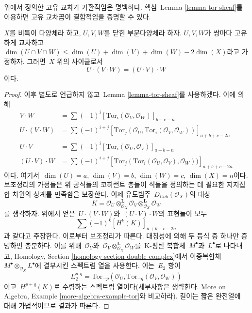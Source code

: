 \noindent
위에서 정의한 고유 교차가 가환적임은 명백하다.
핵심\  Lemma \ref{lemma-tor-sheaf}를 이용하면 고유 교차곱이 결합적임을
증명할 수 있다.

\begin{lemma}
\label{lemma-associative}
$X$를 비특이 다양체라 하고, $U, V, W$를 닫힌 부분다양체라 하자.
$U, V, W$가 쌍마다 고유하게 교차하고\ 
$\dim(U \cap V \cap W) \leq \dim(U) + \dim(V) + \dim(W) - 2\dim(X)$라고
가정하자. 그러면\  $X$ 위의 사이클로서
$$
U \cdot (V \cdot W) = (U \cdot V) \cdot W
$$
이다.
\end{lemma}

\begin{proof}
이후 별도로 언급하지 않고\  Lemma \ref{lemma-tor-sheaf}를 사용하겠다.
이에 의해
\begin{align*}
V \cdot W
& =
\sum (-1)^i [\text{Tor}_i(\mathcal{O}_V, \mathcal{O}_W)]_{b + c - n} \\
U \cdot (V \cdot W)
& =
\sum (-1)^{i + j}
[
\text{Tor}_j(\mathcal{O}_U, \text{Tor}_i(\mathcal{O}_V, \mathcal{O}_W))
]_{a + b + c - 2n} \\
U \cdot V
& =
\sum (-1)^i [\text{Tor}_i(\mathcal{O}_U, \mathcal{O}_V)]_{a + b - n} \\
(U \cdot V) \cdot W
& =
\sum (-1)^{i + j}
[
\text{Tor}_j(\text{Tor}_i(\mathcal{O}_U, \mathcal{O}_V), \mathcal{O}_W))
]_{a + b + c - 2n}
\end{align*}
이다. 여기서\  $\dim(U) = a$, $\dim(V) = b$, $\dim(W) = c$,
$\dim(X) = n$이다. 보조정리의 가정들은 위 공식들의 코히런트 층들이
식들을 정의하는 데 필요한 지지집합 차원의 상계를 만족함을 보장한다.
이제 유도범주\  $D_{\textit{Coh}}(\mathcal{O}_X)$의 대상
$$
K =
\mathcal{O}_U \otimes^\mathbf{L}_{\mathcal{O}_X} \mathcal{O}_V
\otimes^\mathbf{L}_{\mathcal{O}_X} \mathcal{O}_W
$$
를 생각하자. 위에서 얻은\  $U \cdot (V \cdot W)$와\ 
$(U \cdot V) \cdot W$의 표현들이 모두
$$
\sum (-1)^k [H^k(K)]_{a + b + c - 2n}
$$
과 같다고 주장한다. 이로부터 보조정리가 따른다. 대칭성에 의해 두 등식 중
하나만 증명하면 충분하다. 이를 위해\  $\mathcal{O}_U$와\ 
$\mathcal{O}_V \otimes_{\mathcal{O}_X}^\mathbf{L} \mathcal{O}_W$를\ 
K-평탄 복합체\  $M^\bullet$과\  $L^\bullet$로 나타내고,
Homology, Section \ref{homology-section-double-complex}에서
이중복합체\  $M^\bullet \otimes_{\mathcal{O}_X} L^\bullet$에 결부시킨
스펙트럼 열을 사용한다. 이는\  $E_2$ 항이
$$
E_2^{p, q} =
\text{Tor}_{-p}(\mathcal{O}_U, \text{Tor}_{-q}(\mathcal{O}_V, \mathcal{O}_W))
$$
이고\  $H^{p + q}(K)$로 수렴하는 스펙트럼 열이다(세부사항은 생략한다.
More on Algebra, Example \ref{more-algebra-example-tor}와 비교하라).
길이는 짧은 완전열에 대해 가법적이므로 결과가 따른다.
\end{proof}




